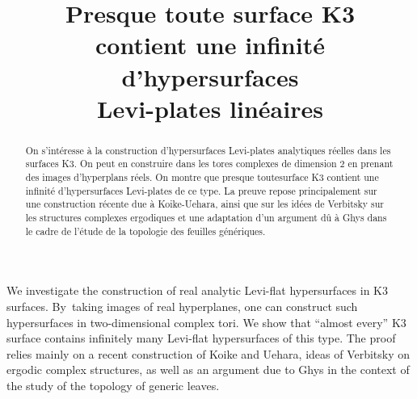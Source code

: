 \documentclass[JEP,XML,SOM,Unicode,francais,published]{cedram}
\theoremstyle{definition}
\begin{document}
\frontmatter

\title[Hypersurfaces Levi-plates linéaires dans les surfaces K3]{Presque toute surface K3\\ contient une infinité d'hypersurfaces\\ Levi-plates linéaires}

\author[\initial{F.} \lastname{Lequen}]{ }
\address{Laboratoire AGM -- CY Cergy Paris Université\\
2 av. Adolphe Chauvin, 95302 Cergy-Pontoise Cedex, France}

\begin{abstract}
On s'intéresse à la construction d'hypersurfaces Levi-plates analytiques réelles dans les surfaces K3. On peut en construire dans les tores complexes de dimension $2$ en prenant des images d'hyperplans réels. On montre que \og presque toute\fg surface K3 contient une infinité d'hypersurfaces Levi-plates de ce type. La preuve repose principalement sur une construction récente due à Koike-Uehara, ainsi que sur les idées de Verbitsky sur les structures complexes ergodiques et une adaptation d'un argument dû à Ghys dans le cadre de l'étude de la topologie des feuilles génériques.
\end{abstract}





\begin{altabstract}
We investigate the construction of real analytic Levi-flat hypersurfaces in K3 surfaces. By~taking images of real hyperplanes, one can construct such hypersurfaces in two-dimensional complex tori. We show that ``almost every'' K3 surface contains infinitely many Levi-flat hyper\-surfaces of this type. The proof relies mainly on a recent construction of Koike and Uehara, ideas of Verbitsky on ergodic complex structures, as well as an argument due to Ghys in the context of the study of the topology of generic leaves.
\end{altabstract}

\maketitle
\vspace*{-.1\baselineskip}
\tableofcontents
\mainmatter
\end{document}
